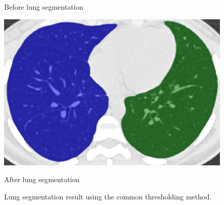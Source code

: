 \documentclass[]{spie}  %
\begin{document}
\begin{figure}[htbp]
\begin{subfigure}
{\begin{minipage}[t]{0.3\linewidth}
	\centerline{Before lung segmentation}
  \label{fig:LungSegmentation-a} 
	\end{minipage}%
   }%
\end{subfigure}
\begin{subfigure}{
  \begin{minipage}[t]{0.3\linewidth}
  \includegraphics[width=\linewidth,trim={{.0\wd0} {.0\wd0} {.0\wd0} {.0\wd0}},clip]{Image/LungSegmentationAfter.png}
  \centerline{After lung segmentation}
  \label{fig:LungSegmentation-b} 
  \end{minipage}%
   }%
\end{subfigure}
\caption{Lung segmentation result using the common thresholding method.}
\label{fig:LungSegmentation}
\end{figure}
\end{document}
